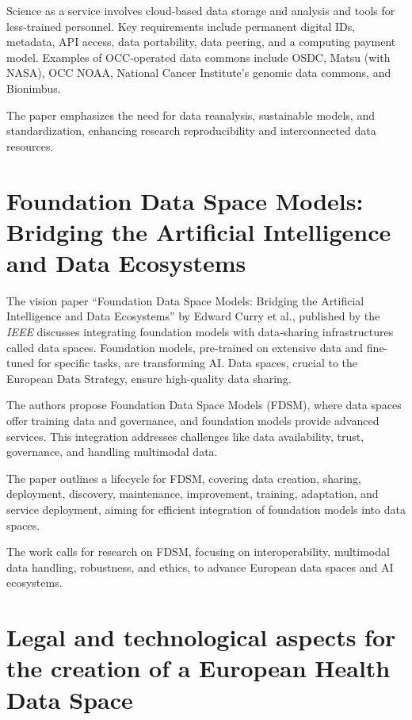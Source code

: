Science as a service involves cloud-based data storage and analysis and tools for less-trained personnel.
Key requirements include permanent digital IDs, metadata, API access, data portability, data peering, and a computing payment model.
Examples of OCC-operated data commons include OSDC, Matsu (with NASA), OCC NOAA, National Cancer Institute’s genomic data commons, and Bionimbus.

The paper emphasizes the need for data reanalysis, sustainable models, and standardization, enhancing research reproducibility and interconnected data resources.

\section{Foundation Data Space Models: Bridging the Artificial Intelligence and Data Ecosystems}\label{sec:foundation-data-space-models:-bridging-the-artificial-intelligence-and-data-ecosystems}

The vision paper ``Foundation Data Space Models: Bridging the Artificial Intelligence and Data Ecosystems'' by Edward Curry et al., published by the \textit{IEEE} discusses integrating foundation models with data-sharing infrastructures called data spaces.
Foundation models, pre-trained on extensive data and fine-tuned for specific tasks, are transforming AI. Data spaces, crucial to the European Data Strategy, ensure high-quality data sharing.

The authors propose Foundation Data Space Models (FDSM), where data spaces offer training data and governance, and foundation models provide advanced services.
This integration addresses challenges like data availability, trust, governance, and handling multimodal data.

The paper outlines a lifecycle for FDSM, covering data creation, sharing, deployment, discovery, maintenance, improvement, training, adaptation, and service deployment, aiming for efficient integration of foundation models into data spaces.

The work calls for research on FDSM, focusing on interoperability, multimodal data handling, robustness, and ethics, to advance European data spaces and AI ecosystems.

\section{Legal and technological aspects for the creation of a European Health Data Space}\label{sec:legal-and-technological-aspects-for-the-creation-of-a-european-health-data-space}

